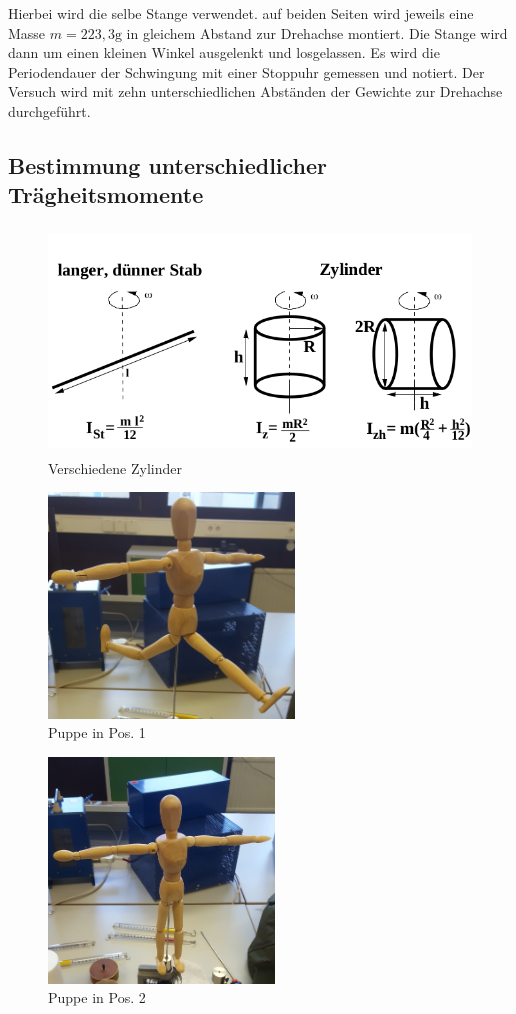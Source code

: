 Hierbei wird die selbe Stange verwendet. auf beiden Seiten wird jeweils eine Masse $m=223,3\si{\gram}$ in gleichem Abstand zur 
Drehachse montiert. Die Stange wird dann um einen kleinen Winkel ausgelenkt und losgelassen. Es wird die Periodendauer der Schwingung
mit einer Stoppuhr gemessen und notiert. Der Versuch wird mit zehn unterschiedlichen Abständen der Gewichte zur Drehachse durchgeführt.

\subsection{Bestimmung unterschiedlicher Trägheitsmomente}
\begin{figure}
    \centering
    \includegraphics[height=6cm]{data/Probekoerper}
    \caption{Verschiedene Zylinder}
    \label{fig:Probekoerper}
\end{figure}

\begin{figure}
    \centering
    \includegraphics[height=6cm]{data/puppe_1}
    \caption{Puppe in Pos. 1}
    \label{fig:puppe_1}
\end{figure}

\begin{figure}
    \centering
    \includegraphics[height=6cm]{data/puppe_2}
    \caption{Puppe in Pos. 2}
    \label{fig:puppe_2}
\end{figure}

